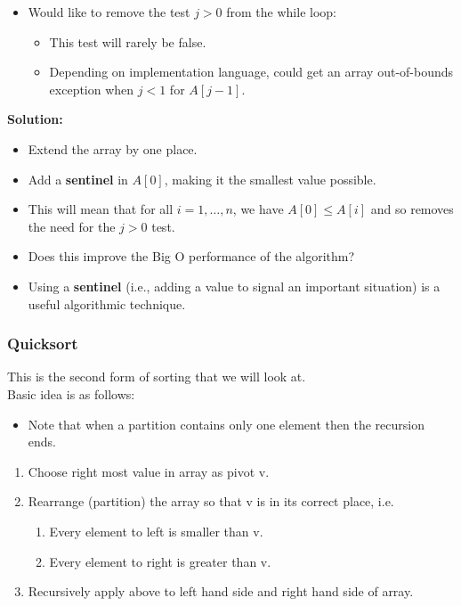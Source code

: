 \documentclass[a4paper,12pt]{article}
\begin{document}
\begin{itemize}
    \item Would like to remove the test \(j > 0\) from the while loop:
    \begin{itemize}
        \item This test will rarely be false.
        \item Depending on implementation language, could get an array out-of-bounds exception when \(j < 1\) for \(A[j-1]\).
    \end{itemize}
\end{itemize}

\textbf{Solution:}
\begin{itemize}
    \item Extend the array by one place.
    \item Add a \textbf{sentinel} in \(A[0]\), making it the smallest value possible.
    \item This will mean that for all \(i = 1, \dots, n\), we have \(A[0] \leq A[i]\) and so removes the need for the \(j > 0\) test.
\end{itemize}

\begin{itemize}
    \item Does this improve the Big O performance of the algorithm?
    \item Using a \textbf{sentinel} (i.e., adding a value to signal an important situation) is a useful algorithmic technique.
\end{itemize}

\subsubsection{Quicksort}

This is the second form of sorting that we will look at.\\

Basic idea is as follows:
\begin{itemize}
    \item Note that when a partition contains only one element then the recursion ends.
\end{itemize}

\begin{enumerate}
    \item Choose right most value in array as pivot v.
    \item Rearrange (partition) the array so that v is in its correct place, i.e.
    
    \begin{enumerate}[label=(\roman*)]
        \item Every element to left is smaller than v.
        \item Every element to right is greater than v.
    \end{enumerate}
    
    \item Recursively apply above to left hand side and right hand side of array.
\end{enumerate}
\end{document}
